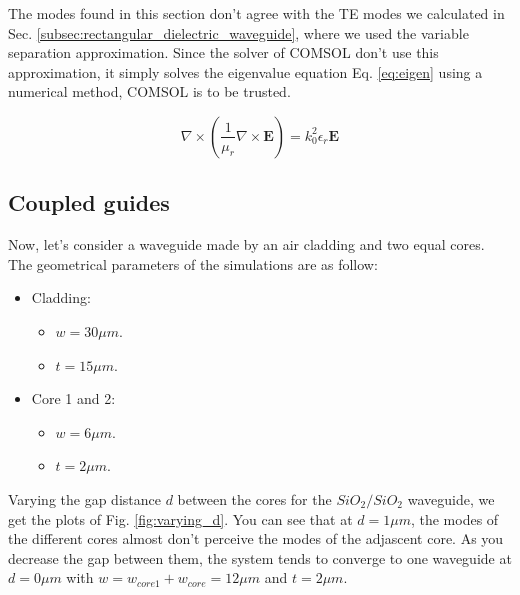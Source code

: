 \documentclass[a4paper,12pt]{article}
\begin{document}
The modes found in this section don't agree with the TE modes we calculated in Sec. \ref{subsec:rectangular_dielectric_waveguide}, where we used the variable separation approximation. Since the solver of COMSOL don't use this approximation, it simply solves the eigenvalue equation Eq. \ref{eq:eigen} using a numerical method, COMSOL is to be trusted.

\begin{equation}
    \nabla \times \left( \frac{1}{\mu_r} \nabla \times \mathbf{E} \right) = k_0^2 \epsilon_r \mathbf{E}
    \label{eq:eigen}
\end{equation}

\subsection{Coupled guides}
\label{subsec:coupled_guides}

Now, let's consider a waveguide made by an air cladding and two equal cores. The geometrical parameters of the simulations are as follow:
\begin{itemize}
    \item Cladding:
    \begin{itemize}
        \item $w = 30\mu m$.
        \item $t = 15\mu m$.
    \end{itemize}
    \item Core 1 and 2:
    \begin{itemize}
        \item $w = 6\mu m$.
        \item $t = 2\mu m$. 
    \end{itemize}
\end{itemize}

Varying the gap distance $d$ between the cores for the $SiO_2/SiO_2$ waveguide, we get the plots of Fig. \ref{fig:varying_d}. You can see that at $d = 1\mu m$, the modes of the different cores almost don't perceive the modes of the adjascent core. As you decrease the gap between them, the system tends to converge to one waveguide at $d = 0\mu m$ with $w = w_{core1} + w_{core} = 12\mu m$ and $t = 2\mu m$.
\end{document}
